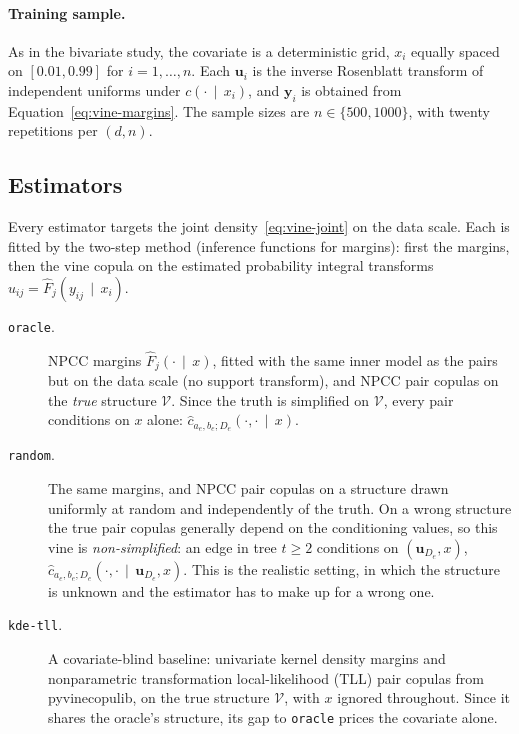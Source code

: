 \documentclass[11pt]{article}
\newcommand{\given}{\,\mid\,}
\begin{document}
\paragraph{Training sample.} As in the bivariate study, the covariate is a
deterministic grid, $x_i$ equally spaced on $[0.01,0.99]$ for
$i=1,\ldots,n$. Each $\mathbf u_i$ is the inverse Rosenblatt transform of
independent uniforms under $c(\cdot \given x_i)$, and $\mathbf y_i$ is
obtained from Equation~\eqref{eq:vine-margins}. The sample sizes are
$n \in \{500,1000\}$, with twenty repetitions per $(d,n)$.

\subsection{Estimators}

Every estimator targets the joint density~\eqref{eq:vine-joint} on the
data scale. Each is fitted by the two-step method (inference functions for
margins): first the margins, then the vine copula on the estimated
probability integral transforms $\widehat u_{ij} = \widehat F_j(y_{ij}
\given x_i)$.

\begin{description}
  \item[\texttt{oracle}.] NPCC margins
    $\widehat F_j(\cdot \given x)$, fitted with the same inner model as
    the pairs but on the data scale (no support transform), and NPCC pair
    copulas on the \emph{true} structure $\mathcal V$. Since the truth is
    simplified on $\mathcal V$, every pair conditions on $x$ alone:
    $\widehat c_{a_e,b_e;D_e}(\cdot,\cdot \given x)$.
  \item[\texttt{random}.] The same margins, and NPCC pair copulas on a
    structure drawn uniformly at random and independently of the truth.
    On a wrong structure the true pair copulas generally depend on the
    conditioning values, so this vine is \emph{non-simplified}: an edge
    in tree $t \ge 2$ conditions on $(\mathbf u_{D_e}, x)$,
    $\widehat c_{a_e,b_e;D_e}(\cdot,\cdot \given \mathbf u_{D_e}, x)$. This
    is the realistic setting, in which the structure is unknown and the
    estimator has to make up for a wrong one.
  \item[\texttt{kde-tll}.] A covariate-blind baseline: univariate kernel
    density margins and nonparametric transformation local-likelihood
    (TLL) pair copulas from pyvinecopulib, on the true structure
    $\mathcal V$, with $x$ ignored throughout. Since it shares the
    oracle's structure, its gap to \texttt{oracle} prices the covariate
    alone.
\end{description}
\end{document}
